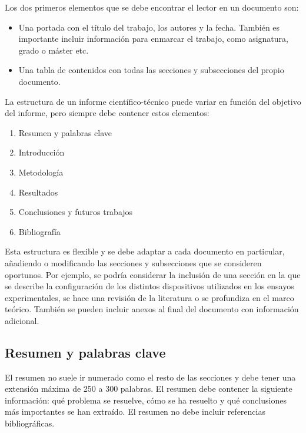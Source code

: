 \documentclass[11pt]{article}
\begin{document}
Los dos primeros elementos que se debe encontrar el lector en un documento son:

\begin{itemize}

    \item Una portada con el título del trabajo, los autores y la fecha. También es importante incluir información para enmarcar el trabajo, como asignatura, grado o máster etc.
    
    \item Una tabla de contenidos con todas las secciones y subsecciones del propio documento.
    
\end{itemize}

La estructura de un informe científico-técnico puede variar en función del objetivo del informe, pero siempre debe contener estos elementos:

\begin{enumerate} \itemsep = 0ex %
    \item Resumen y palabras clave
    \item Introducción
    \item Metodología
    \item Resultados
    \item Conclusiones y futuros trabajos
    \item Bibliografía
\end{enumerate}

Esta estructura es flexible y se debe adaptar a cada documento en particular, añadiendo o modificando las secciones y subsecciones que se consideren oportunos. Por ejemplo, se podría considerar la inclusión de una sección en la que se describe la configuración de los distintos dispositivos utilizados en los ensayos experimentales, se hace una revisión de la literatura o se profundiza en el marco teórico. También se pueden incluir anexos al final del documento con información adicional.

\subsection{Resumen y palabras clave}

El resumen no suele ir numerado como el resto de las secciones y debe tener una extensión máxima de 250 a 300 palabras. El resumen debe contener la siguiente información: qué problema se resuelve, cómo se ha resuelto y qué conclusiones más importantes se han extraído. El resumen no debe incluir referencias bibliográficas.
\end{document}
